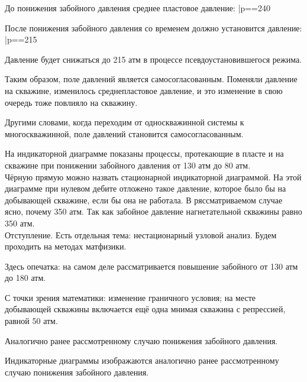 \documentclass[main.tex]{subfiles}
\begin{document}
До понижения забойного давления среднее пластовое давление:
\beq
\bar{p}==240
\eeq

После понижения забойного давления со временем должно установится давление:
\beq
\bar{p}==215
\eeq

Давление будет снижаться до 215 атм в процессе псевдоустановившегося режима.

Таким образом, поле давлений является самосогласованным. Поменяли давление на скважине, изменилось среднепластовое давление, и это изменение в свою очередь тоже повлияло на скважину.

Другими словами, когда переходим от односкважинной системы к многоскважинной, поле давлений становится самосогласованным.


На индикаторной диаграмме показаны процессы, протекающие в пласте и на скважине при понижении забойного давления от 130 атм до 80 атм.\\

Чёрную прямую можно назвать стационарной индикаторной диаграммой. На этой диаграмме при нулевом дебите отложено такое давление, которое было бы на добывающей скважине, если бы она не работала. В ряссматриваемом случае ясно, почему 350 атм. Так как забойное давление нагнетательной скважины равно 350 атм.\\

Отступление. Есть отдельная тема: нестационарный узловой анализ. Будем проходить на методах матфизики.


Здесь опечатка: на самом деле рассматривается повышение забойного от 130 атм до 180 атм.

С точки зрения математики: изменение граничного условия; на месте добывающей скважины включается ещё одна мнимая скважина с репрессией, равной 50 атм.


Аналогично ранее рассмотренному случаю понижения забойного давления.


Индикаторные диаграммы изображаются аналогично ранее рассмотренному случаю понижения забойного давления.

\end{document}
